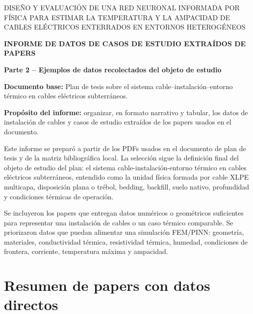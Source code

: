 \documentclass[11pt,a4paper,oneside]{report}
\newcommand{\tesisbodyfont}{\fontsize{11}{13.6}\selectfont}
\newcommand{\tituloTesis}{DISEÑO Y EVALUACIÓN DE UNA RED NEURONAL INFORMADA POR FÍSICA PARA ESTIMAR LA TEMPERATURA Y LA AMPACIDAD DE CABLES ELÉCTRICOS ENTERRADOS EN ENTORNOS HETEROGÉNEOS}
\newcommand{\tituloInforme}{Informe de datos de casos de estudio extraídos de papers}
\newcommand{\subtituloInforme}{Parte 2 -- Ejemplos de datos recolectados del objeto de estudio}
\begin{document}
\tesisbodyfont
{}

\begin{center}
{\fontsize{9}{10.8}\selectfont\MakeUppercase{\tituloTesis}\par}
\vspace{0.35cm}
{\fontsize{14}{16.8}\selectfont\bfseries\MakeUppercase{\tituloInforme}\par}
\vspace{0.25cm}
{\fontsize{11}{13.2}\selectfont\bfseries \subtituloInforme\par}
\end{center}

\vspace{0.45cm}
\noindent\textbf{Documento base:} Plan de tesis sobre el sistema cable--instalación--entorno térmico en cables eléctricos subterráneos.

\noindent\textbf{Propósito del informe:} organizar, en formato narrativo y tabular, los datos de instalación de cables y casos de estudio extraídos de los papers usados en el documento.


Este informe se preparó a partir de los PDFs usados en el documento de
plan de tesis y de la matriz bibliográfica local. La selección sigue la
definición final del objeto de estudio del plan: el sistema
cable-instalación-entorno térmico en cables eléctricos subterráneos,
entendido como la unidad física formada por cable XLPE multicapa,
disposición plana o trébol, bedding, backfill, suelo nativo, profundidad
y condiciones térmicas de operación.

Se incluyeron los papers que entregan datos numéricos o geométricos
suficientes para representar una instalación de cables o un caso térmico
comparable. Se priorizaron datos que puedan alimentar una simulación
FEM/PINN: geometría, materiales, conductividad térmica, resistividad
térmica, humedad, condiciones de frontera, corriente, temperatura máxima
y ampacidad.

\section{Resumen de papers con datos
directos}\label{resumen-de-papers-con-datos-directos}
\end{document}
